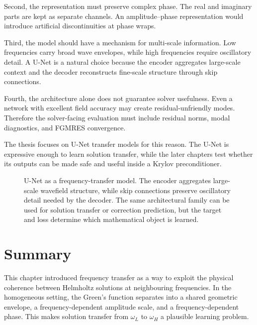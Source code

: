 Second, the representation must preserve complex phase. The real and imaginary
parts are kept as separate channels. An amplitude--phase representation would
introduce artificial discontinuities at phase wraps.

Third, the model should have a mechanism for multi-scale information. Low
frequencies carry broad wave envelopes, while high frequencies require
oscillatory detail. A U-Net is a natural choice because the encoder aggregates
large-scale context and the decoder reconstructs fine-scale structure through
skip connections.

Fourth, the architecture alone does not guarantee solver usefulness. Even a
network with excellent field accuracy may create residual-unfriendly modes.
Therefore the solver-facing evaluation must include residual norms, modal
diagnostics, and FGMRES convergence.

The thesis focuses on U-Net transfer models for this reason. The U-Net is
expressive enough to learn solution transfer, while the later chapters test
whether its outputs can be made safe and useful inside a Krylov preconditioner.

\begin{figure}[htbp]
    \centering
    \caption{U-Net as a frequency-transfer model. The encoder aggregates
    large-scale wavefield structure, while skip connections preserve
    oscillatory detail needed by the decoder. The same architectural family can
    be used for solution transfer or correction prediction, but the target and
    loss determine which mathematical object is learned.}
    \label{fig:ch5-unet-frequency-transfer-schematic}
\end{figure}

\section{Summary}
\label{sec:ch5-summary}

This chapter introduced frequency transfer as a way to exploit the physical
coherence between Helmholtz solutions at neighbouring frequencies. In the
homogeneous setting, the Green's function separates into a shared geometric
envelope, a frequency-dependent amplitude scale, and a frequency-dependent
phase. This makes solution transfer from $\omega_L$ to $\omega_H$ a plausible
learning problem.

